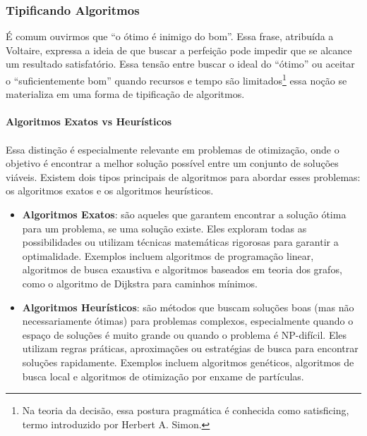 \documentclass[12pt,a4paper]{article}
\def\emph#1{#1}%
\begin{document}
\subsubsection{Tipificando Algoritmos}

É comum ouvirmos que “o ótimo é inimigo do bom”. Essa frase, atribuída a Voltaire, expressa a ideia de que buscar a perfeição pode impedir que se alcance um resultado satisfatório. Essa tensão entre buscar o ideal do “ótimo”  ou aceitar o “suficientemente bom” quando recursos e tempo são limitados\footnote{Na teoria da decisão, essa postura pragmática é conhecida como \emph{satisficing}, termo introduzido por Herbert A. Simon.} essa noção se materializa em uma forma de tipificação de algoritmos.

\paragraph{Algoritmos Exatos vs Heurísticos}

\paragraph{}
Essa distinção é especialmente relevante em problemas de otimização, onde o objetivo é encontrar a melhor solução possível entre um conjunto de soluções viáveis. Existem dois tipos principais de algoritmos para abordar esses problemas: os \emph{algoritmos exatos} e os \emph{algoritmos heurísticos}.

\begin{itemize}\setlength{\itemsep}{2pt}
    \item \textbf{Algoritmos Exatos}: são aqueles que garantem encontrar a solução ótima para um problema, se uma solução existe. Eles exploram todas as possibilidades ou utilizam técnicas matemáticas rigorosas para garantir a optimalidade. Exemplos incluem algoritmos de programação linear, algoritmos de busca exaustiva e algoritmos baseados em teoria dos grafos, como o algoritmo de Dijkstra para caminhos mínimos.
    \item \textbf{Algoritmos Heurísticos}: são métodos que buscam soluções boas (mas não necessariamente ótimas) para problemas complexos, especialmente quando o espaço de soluções é muito grande ou quando o problema é NP-difícil. Eles utilizam regras práticas, aproximações ou estratégias de busca para encontrar soluções rapidamente. Exemplos incluem algoritmos genéticos, algoritmos de busca local e algoritmos de otimização por enxame de partículas.
\end{itemize}
\end{document}

